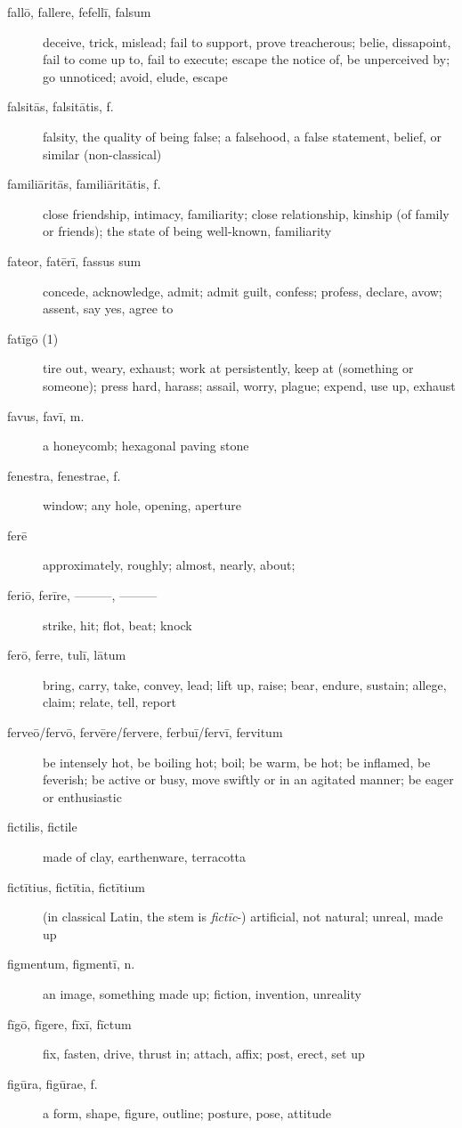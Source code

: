 \begin{description}
    \item[fallō, fallere, fefellī, falsum] \marginnote{*}deceive, trick, mislead; fail to support, prove treacherous; belie, dissapoint, fail to come up to, fail to execute; escape the notice of, be unperceived by; go unnoticed; avoid, elude, escape
    \item[falsitās, falsitātis, f.] falsity, the quality of being false; a falsehood, a false statement, belief, or similar (non-classical)
    \item[familiāritās, familiāritātis, f.] close friendship, intimacy, familiarity; close relationship, kinship (of family or friends); the state of being well-known, familiarity
    \item[fateor, fatērī, fassus sum] \marginnote{*}concede, acknowledge, admit; admit guilt, confess; profess, declare, avow; assent, say yes, agree to
    \item[fatīgō (1)] tire out, weary, exhaust; work at persistently, keep at (something or someone); press hard, harass; assail, worry, plague; expend, use up, exhaust
    \item[favus, favī, m.] a honeycomb; hexagonal paving stone
    \item[fenestra, fenestrae, f.] window; any hole, opening, aperture
    \item[ferē] approximately, roughly; almost, nearly, about; 
    \item[feriō, ferīre, ———, ———] strike, hit; flot, beat; knock
    \item[ferō, ferre, tulī, lātum] \marginnote{*}bring, carry, take, convey, lead; lift up, raise; bear, endure, sustain; allege, claim; relate, tell, report
    \item[ferveō/fervō, fervēre/fervere, ferbuī/fervī, fervitum] be intensely hot, be boiling hot; boil; be warm, be hot; be inflamed, be feverish; be active or busy, move swiftly or in an agitated manner; be eager or enthusiastic
    \item[fictilis, fictile] made of clay, earthenware, terracotta
    \item[fictītius, fictītia, fictītium]  (in classical Latin, the stem is \textit{fictīc}-) artificial, not natural; unreal, made up
    \item[figmentum, figmentī, n.] an image, something made up; fiction, invention, unreality
    \item[fīgō, fīgere, fīxī, fīctum] fix, fasten, drive, thrust in; attach, affix; post, erect, set up
    \item[figūra, figūrae, f.] a form, shape, figure, outline; posture, pose, attitude

\end{description}

